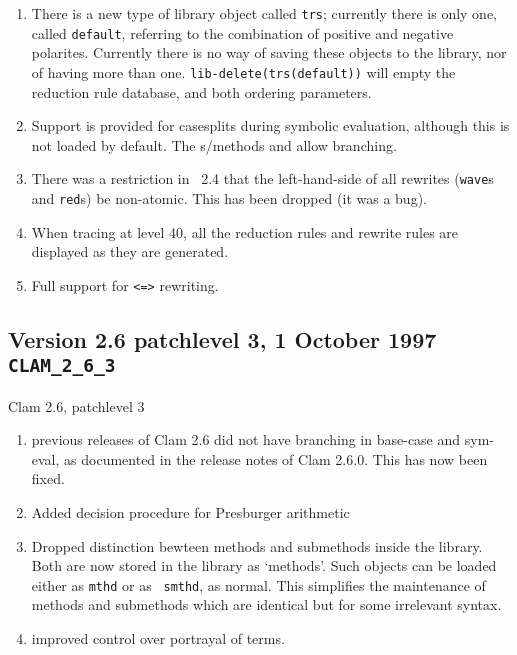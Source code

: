 \begin{enumerate}
\item  There is a new type of library object called {\tt trs}; currently
          there is only one, called {\tt default}, referring to the
combination of positive and negative polarites.  Currently there is no way of
          saving these objects to the library, nor of having more than
          one. {\tt lib-delete(trs(default))} will empty the reduction rule
          database, and both ordering parameters.
\item  Support is provided for casesplits during symbolic
          evaluation, although this is not loaded by default.  The
          s/methods  and  allow branching.
\item  There was a restriction in \clam~2.4 that the left-hand-side of all
          rewrites ({\tt wave}s and {\tt red}s) be non-atomic.  This has been
          dropped (it was a bug).
\item  When tracing at level 40, all the reduction rules and
          rewrite rules are displayed as they are generated.
\item  Full support for {\tt <=>} rewriting.
\end{enumerate}


\subsection {Version 2.6 patchlevel 3, 1 October 1997 {\tt CLAM\_2\_6\_3}}
Clam 2.6, patchlevel 3

\begin{enumerate}
\item previous releases of Clam 2.6 did not have branching in
          base-case and sym-eval, as documented in the release notes
          of Clam 2.6.0.  This has now been fixed.
\item Added decision procedure for Presburger arithmetic
\item Dropped distinction bewteen methods and submethods inside the
          library.  Both are now stored in the library as `methods'.
          Such objects can be loaded either as {\tt mthd} or as {\tt
          smthd}, as normal.  This simplifies the maintenance of
          methods and submethods which are identical but for some
          irrelevant syntax.  
\item improved control over portrayal of terms.
\end{enumerate}

